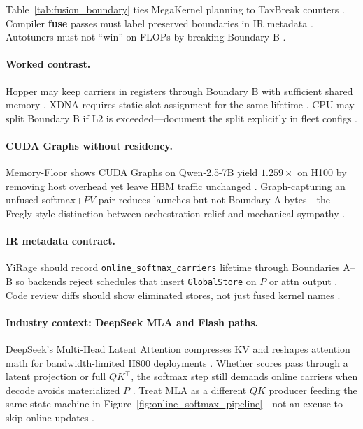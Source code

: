 Table~\ref{tab:fusion_boundary} ties MegaKernel planning to TaxBreak counters \citep{taxbreak2026,memoryfloor2026}. Compiler \textbf{fuse} passes must label preserved boundaries in IR metadata \citep{yirage2026,chen2020compilerbasedhardw}. Autotuners must not ``win'' on FLOPs by breaking Boundary B \citep{patel2025llminference,semianalysis2024tma}.

\paragraph{Worked contrast.} Hopper may keep carriers in registers through Boundary B with sufficient shared memory \citep{semianalysis2024tma,nvidia2022hopper}. XDNA requires static slot assignment for the same lifetime \citep{amd2024aie}. CPU may split Boundary B if L2 is exceeded---document the split explicitly in fleet configs \citep{dlbook,yirage2026}.

\paragraph{CUDA Graphs without residency.} Memory-Floor shows CUDA Graphs on Qwen-2.5-7B yield $1.259\times$ on H100 by removing host overhead yet leave HBM traffic unchanged \citep{memoryfloor2026,nvidia2024cudagraphs}. Graph-capturing an unfused softmax+$PV$ pair reduces launches but not Boundary A bytes---the Fregly-style distinction between orchestration relief and mechanical sympathy \citep{taxbreak2026,patel2025llminference}.

\paragraph{IR metadata contract.} YiRage should record \texttt{online\_softmax\_carriers} lifetime through Boundaries A--B so backends reject schedules that insert \texttt{GlobalStore} on $P$ or attn output \citep{yirage2026,chen2020compilerbasedhardw}. Code review diffs should show eliminated stores, not just fused kernel names \citep{memoryfloor2026,taxbreak2026}.



\paragraph{Industry context: DeepSeek MLA and Flash paths.} DeepSeek's Multi-Head Latent Attention compresses KV and reshapes attention math for bandwidth-limited H800 deployments \citep{liu2024deepseekv3,patel2025llminference}. Whether scores pass through a latent projection or full $QK^\top$, the softmax step still demands online carriers when decode avoids materialized $P$ \citep{dao2022flashattention}. Treat MLA as a different $QK$ producer feeding the same state machine in Figure~\ref{fig:online_softmax_pipeline}---not an excuse to skip online updates \citep{yirage2026,taxbreak2026}.

